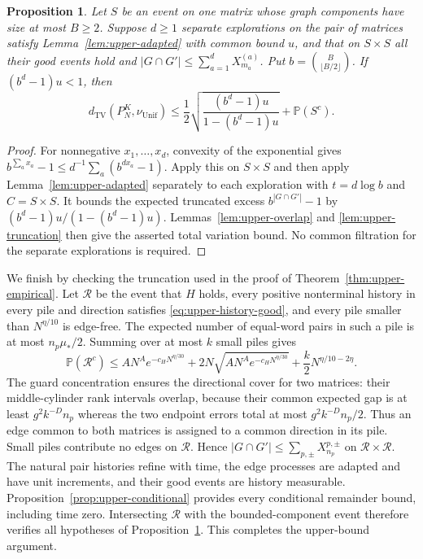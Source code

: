 \documentclass[11pt]{article}
\numberwithin{equation}{section}
\newtheorem{proposition}[theorem]{Proposition}
\theoremstyle{definition}
\theoremstyle{remark}
\newcommand{\Pp}{\mathbb P}
\newcommand{\TV}{\mathrm{TV}}
\newcommand{\Unif}{\mathrm{Unif}}
\newcommand{\dTV}{d_{\TV}}
\newcommand{\nuUnif}{\nu_{\Unif}}
\newcommand{\1}{\mathbf 1}
\begin{document}
\begin{proposition}%
\label{prop:upper-exponential}
Let $S$ be an event on one matrix whose graph components have size
at most $B\ge2$. Suppose $d\ge1$ separate explorations on the pair
of matrices satisfy Lemma~\ref{lem:upper-adapted} with common bound
$u$, and that on $S\times S$ all their good events hold and
$|G\cap G'|\le\sum_{a=1}^d X_{m_a}^{(a)}$.
Put $b=\binom B{\lfloor B/2\rfloor}$. If $(b^d-1)u<1$, then
\[
 \dTV(P_N^K,\nuUnif)
 \le\frac12\sqrt{\frac{(b^d-1)u}{1-(b^d-1)u}}+\Pp(S^c).
\]
\end{proposition}
\begin{proof}
For nonnegative $x_1,\ldots,x_d$, convexity of the exponential gives
$b^{\sum_a x_a}-1\le d^{-1}\sum_a(b^{d x_a}-1)$.
Apply this on $S\times S$ and then apply
Lemma~\ref{lem:upper-adapted} separately to each exploration with
$t=d\log b$ and $C=S\times S$. It bounds the expected truncated
excess $b^{|G\cap G'|}-1$ by $(b^d-1)u/(1-(b^d-1)u)$.
Lemmas~\ref{lem:upper-overlap} and \ref{lem:upper-truncation}
then give the asserted total variation bound. No common filtration
for the separate explorations is required.
\end{proof}

We finish by checking the truncation used in the proof of
Theorem~\ref{thm:upper-empirical}. Let $\mathcal R$ be the event
that $H$ holds, every positive nonterminal history in every pile
and direction satisfies \eqref{eq:upper-history-good}, and every
pile smaller than $N^{\eta/10}$ is edge-free. The expected number
of equal-word pairs in such a pile is at most
$n_p\mu_*/2$. Summing over at most $k$ small piles gives
\[
 \Pp(\mathcal R^c)\le AN^A e^{-c_HN^{\eta/30}}
      +2N\sqrt{AN^A e^{-c_HN^{\eta/30}}}
      +\frac{k}{2}N^{\eta/10-2\eta}.
\]
The guard concentration ensures the directional cover for two
matrices: their middle-cylinder rank intervals overlap, because
their common expected gap is at least $g^2k^{-D}n_p$ whereas the
two endpoint errors total at most $g^2k^{-D}n_p/2$.
Thus an edge common to both matrices is assigned to a common
direction in its pile. Small piles contribute no edges on
$\mathcal R$. Hence
$|G\cap G'|\le\sum_{p,\pm}X_{n_p}^{p,\pm}$ on
$\mathcal R\times\mathcal R$.
The natural pair histories refine with time, the edge processes
are adapted and have unit increments, and their good events are
history measurable. Proposition~\ref{prop:upper-conditional}
provides every conditional remainder bound, including time zero.
Intersecting $\mathcal R$ with the bounded-component event therefore
verifies all hypotheses of Proposition~\ref{prop:upper-exponential}.
This completes the upper-bound argument.
\end{document}

